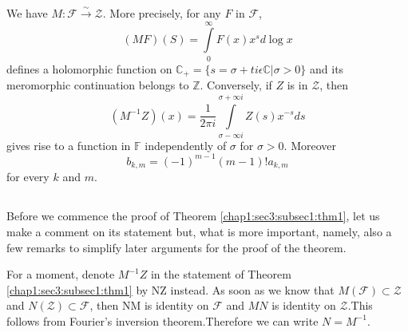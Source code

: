 \begin{theorem}\label{chap1:sec3:subsec1:thm1} %
  We have $M:\mathcal{F}\xrightarrow{\sim}\mathcal{Z}$. More precisely,
  for any $F$ in $\mathcal{F}$,
  \begin{equation*}
    (MF)(S)=\int\limits_{0}^{\infty}F(x)x^{s}d\log x
  \end{equation*}
  defines a holomorphic function on $\mathbb{C}_{+}=\{s = \sigma+ti
  \epsilon\mathbb{C}\vert\sigma> 0\}$ and its meromorphic continuation
  belongs to $\mathbb{Z}$. Conversely, if $Z$ is in $\mathcal{Z}$, then 
  \begin{equation*}
    (M^{-1}Z)(x)=\frac{1}{2\pi i}\int\limits_{\sigma-\infty
      i}^{\sigma+\infty i} Z(s)x^{-s} ds 
  \end{equation*}
  gives rise to a function in $\mathbb{F}$ independently of $\sigma$ for
  $\sigma> 0$. Moreover 
  \begin{equation*}
    b_{k,m}=(-1)^{m-1}(m-1)!a_{k,m}\tag{5}\label{chap1:sec3:subsec1:eq5}
  \end{equation*}
  for every $k$ and $m$.
\end{theorem}

\subsection{}\label{chap1:sec3:subsec2} %

Before we commence the proof of Theorem \ref{chap1:sec3:subsec1:thm1}, let us make a comment on
its statement but, what is more important, namely, also a few remarks
to simplify later arguments for the proof of the theorem. 

For a moment, denote $M^{-1}Z$ in the statement of Theorem
\ref{chap1:sec3:subsec1:thm1} by NZ 
instead. As soon as we know that $M(\mathscr{F})\subset\mathscr{Z}$
and $N(\mathscr{Z})\subset\mathscr{F}$, then NM is identity on
$\mathscr{F}$ and $MN$ is identity on $\mathscr{Z}$.This follows from
Fourier's inversion theorem.\pageoriginale Therefore we can write $N=M^{-1}$.

